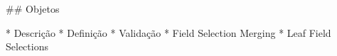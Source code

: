 ## Objetos

* Descrição
* Definição
* Validação
  * Field Selection Merging
  * Leaf Field Selections
